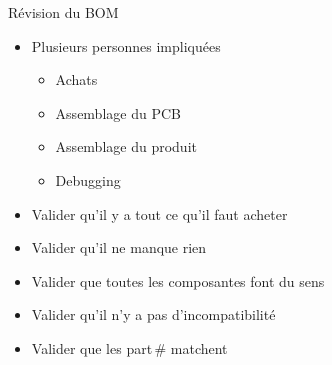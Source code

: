 \begin{frame}{Révision du BOM}
    \begin{itemize}
        \item Plusieurs personnes impliquées
        \begin{itemize}
            \item Achats
            \item Assemblage du PCB
            \item Assemblage du produit
            \item Debugging
        \end{itemize}
        \bigskip
        \item Valider qu'il y a tout ce qu'il faut acheter
        \item Valider qu'il ne manque rien
        \item Valider que toutes les composantes font du sens
        \item Valider qu'il n'y a pas d'incompatibilité
        \item Valider que les part\,\# matchent
    \end{itemize}
\end{frame}
